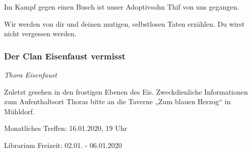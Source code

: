 Im Kampf gegen einen Busch ist unser Adoptivsohn Thif von uns gegangen.

Wir werden von dir und deinen mutigen, selbstlosen Taten erzählen.
Du wirst nicht vergessen werden.

\subsubsection{Der Clan Eisenfaust vermisst}

\begin{center}
  \textit{Thora Eisenfaust}
\end{center}

Zuletzt gesehen in den frostigen Ebenen des Eis.
Zweckdienliche Informationen zum Aufenthaltsort Thoras bitte an die Taverne „Zum blauen Herzog“ in Mühldorf.




\begin{termine}
  \item Monatliches Treffen: 16.01.2020, 19 Uhr
  \item Librarium Freizeit: 02.01. - 06.01.2020
\end{termine}


